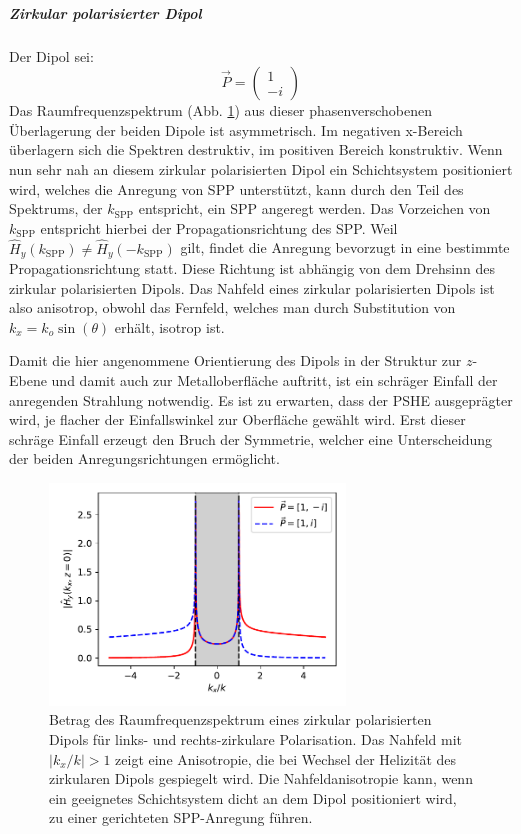 \documentclass[titlepage,  ngerman]{article}
\begin{document}
	\subparagraph{Zirkular polarisierter Dipol}
	Der Dipol sei:
	$$\vec{P} = \begin{pmatrix} 1 \\ -i\end{pmatrix}$$
	Das Raumfrequenzspektrum (Abb. \ref{fig:spatial_spectrum_circ}) aus dieser phasenverschobenen Überlagerung der beiden Dipole ist asymmetrisch.  Im negativen x-Bereich überlagern sich die Spektren destruktiv, im positiven Bereich konstruktiv. Wenn nun sehr nah an diesem zirkular polarisierten Dipol ein Schichtsystem positioniert wird, welches die Anregung von SPP unterstützt, kann durch den Teil des Spektrums, der $k_{\mathrm{SPP}}$ entspricht, ein SPP angeregt werden. Das Vorzeichen von $k_{\mathrm{SPP}}$ entspricht hierbei der Propagationsrichtung des SPP. Weil $\hat{H}_y(k_{\mathrm{SPP}}) \neq \hat{H}_y( -k_{\mathrm{SPP}}) $ gilt, findet die Anregung bevorzugt in eine bestimmte Propagationsrichtung statt. Diese Richtung ist abhängig von dem Drehsinn des zirkular polarisierten Dipols.			
	Das Nahfeld eines zirkular polarisierten Dipols ist also anisotrop, obwohl das Fernfeld, welches man durch Substitution von $k_x = k_o \sin(\theta)$ erhält, isotrop ist.
	
	Damit die hier angenommene Orientierung des Dipols in der Struktur zur $z$-Ebene und damit auch zur Metalloberfläche auftritt, ist ein schräger Einfall der anregenden Strahlung notwendig. Es ist zu erwarten, dass der PSHE ausgeprägter wird, je flacher der Einfallswinkel zur Oberfläche gewählt wird. Erst dieser schräge Einfall erzeugt den Bruch der Symmetrie, welcher eine Unterscheidung der beiden Anregungsrichtungen ermöglicht.
	\begin{figure}[h]
		\centering
		\includegraphics[width=0.7\textwidth]{figures/spatial_spectrum_circ.pdf}
		\caption[Raumfrequenzspektrum zirkular polarisierter Dipol]{Betrag des Raumfrequenzspektrum eines zirkular polarisierten Dipols für links- und rechts-zirkulare Polarisation. Das Nahfeld mit $|k_x/k| >1$ zeigt eine Anisotropie, die bei Wechsel der Helizität des zirkularen Dipols gespiegelt wird. Die Nahfeldanisotropie kann, wenn ein geeignetes Schichtsystem dicht an dem Dipol positioniert wird, zu einer gerichteten SPP-Anregung führen.}
		\label{fig:spatial_spectrum_circ}
	\end{figure}	
	
\end{document}
